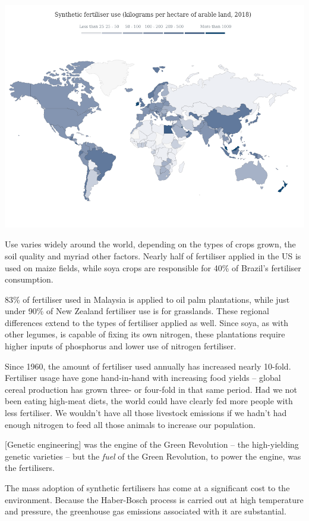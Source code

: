 \documentclass[
]{book}
\begin{document}
\includegraphics{fig/syntetic_fertilizer_map.png}

Use varies widely around the world, depending on the types of crops grown, the soil quality and myriad other factors. Nearly half of fertiliser applied in the US is used on maize fields, while soya crops are responsible for 40\% of Brazil's fertiliser consumption.

83\% of fertiliser used in Malaysia is applied to oil palm plantations, while just under 90\% of New Zealand fertiliser use is for grasslands. These regional differences extend to the types of fertiliser applied as well. Since soya, as with other legumes, is capable of fixing its own nitrogen, these plantations require higher inputs of phosphorus and lower use of nitrogen fertiliser.

Since 1960, the amount of fertiliser used annually has increased nearly 10-fold.
Fertiliser usage have gone hand-in-hand with increasing food yields -- global cereal production has grown three- or four-fold in that same period.
Had we not been eating high-meat diets, the world could have clearly fed more people with less fertiliser.
We wouldn't have all those livestock emissions if we hadn't had enough nitrogen to feed all those animals to increase our population.

{[}Genetic engineering{]} was the engine of the Green Revolution -- the high-yielding genetic varieties -- but the \emph{fuel} of the Green Revolution, to power the engine, was the fertilisers.

The mass adoption of synthetic fertilisers has come at a significant cost to the environment. Because the Haber-Bosch process is carried out at high temperature and pressure, the greenhouse gas emissions associated with it are substantial.
\end{document}
